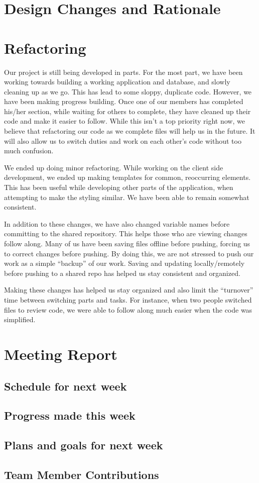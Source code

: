 \documentclass[12pt]{article}
\begin{document}
\section{Design Changes and Rationale}

\section{Refactoring}

Our project is still being developed in parts. For the most part, we have
been working towards building a working application and database, and slowly
cleaning up as we go. This has lead to some sloppy, duplicate code. However,
we have been making progress building. Once one of our members has completed
his/her section, while waiting for others to complete, they have cleaned up
their code and make it easier to follow. While this isn’t a top priority
right now, we believe that refactoring our code as we complete files will
help us in the future. It will also allow us to switch duties and work on
each other's code without too much confusion.

We ended up doing minor refactoring. While working on the client side
development, we ended up making templates for common, reoccurring elements.
This has been useful while developing other parts of the application, when
attempting to make the styling similar. We have been able to remain somewhat
consistent.

In addition to these changes, we have also changed variable names before
committing to the shared repository. This helps those who are viewing
changes follow along. Many of us have been saving files offline before
pushing, forcing us to correct changes before pushing. By doing this, we are
not stressed to push our work as a simple “backup” of our work. Saving and
updating locally/remotely before pushing to a shared repo has helped us stay
consistent and organized.

Making these changes has helped us stay organized and also limit the
“turnover” time between switching parts and tasks. For instance, when two
people switched files to review code, we were able to follow along much
easier when the code was simplified.

\section{Meeting Report}
\subsection{Schedule for next week}

\subsection{Progress made this week}

\subsection{Plans and goals for next week}
\subsection{Team Member Contributions}
\end{document}
